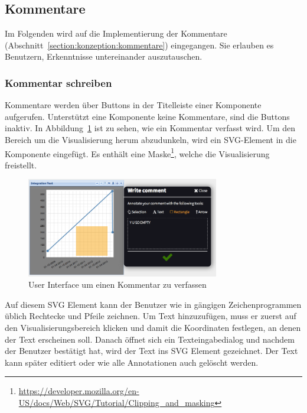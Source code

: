 \documentclass[
	headsepline,
	footsepline,
	fontsize=12pt,
	bibliography=totoc
]{scrbook}
\begin{document}
\subsection{Kommentare}
\label{section:implementierung:frontend:kommentare}

Im Folgenden wird auf die Implementierung der Kommentare (Abschnitt~\ref{section:konzeption:kommentare}) eingegangen. Sie erlauben es Benutzern, Erkenntnisse untereinander auszutauschen.

\subsubsection{Kommentar schreiben}

Kommentare werden über Buttons in der Titelleiste einer Komponente aufgerufen. Unterstützt eine Komponente keine Kommentare, sind die Buttons inaktiv. In Abbildung~\ref{figure:ui-write-comment} ist zu sehen, wie ein Kommentar verfasst wird. Um den Bereich um die Visualisierung herum abzudunkeln, wird ein SVG-Element in die Komponente eingefügt. Es enthält eine Maske\footnote{\url{https://developer.mozilla.org/en-US/docs/Web/SVG/Tutorial/Clipping_and_masking}}, welche die Visualisierung freistellt.

\begin{figure}[htbp]
   \centering
   \includegraphics[width=0.75\textwidth]{images/implementierung-ui-write-comment.png}
   \caption{User Interface um einen Kommentar zu verfassen}
   \label{figure:ui-write-comment}
\end{figure}

Auf diesem SVG Element kann der Benutzer wie in gängigen Zeichenprogrammen üblich Rechtecke und Pfeile zeichnen. Um Text hinzuzufügen, muss er zuerst auf den Visualisierungsbereich klicken und damit die Koordinaten festlegen, an denen der Text erscheinen soll. Danach öffnet sich ein Texteingabedialog und nachdem der Benutzer bestätigt hat, wird der Text ins SVG Element gezeichnet. Der Text kann später editiert oder wie alle Annotationen auch gelöscht werden.
\end{document}
